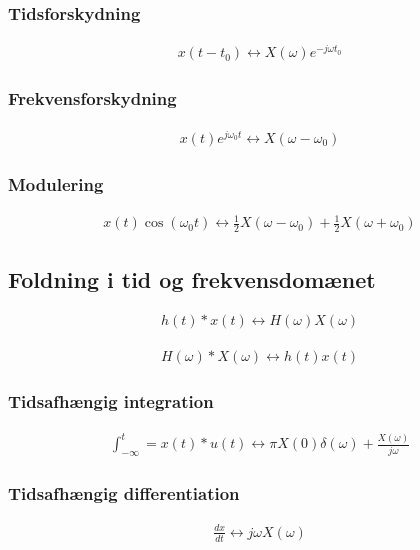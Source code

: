 	\subsubsection{Tidsforskydning}
		\begin{align}
			x(t-t_0)\leftrightarrow X(\omega)e^{-j\omega t_0}
		\end{align}

	\subsubsection{Frekvensforskydning}
		\begin{align}
			x(t)e^{j\omega_0t}\leftrightarrow X(\omega-\omega_0)
		\end{align}

	\subsubsection{Modulering}
		\begin{align}
			x(t)\cos(\omega_0t)\leftrightarrow\frac{1}{2}X(\omega-\omega_0)+\frac{1}{2}X(\omega+\omega_0)
		\end{align}

\subsection{Foldning i tid og frekvensdomænet}
	\begin{align}
		h(t)*x(t)\leftrightarrow H(\omega)X(\omega)
	\end{align}

	\begin{align}
		H(\omega)*X(\omega)\leftrightarrow h(t)x(t)
	\end{align}

	\subsubsection{Tidsafhængig integration}
		\begin{align}
			\int_{-\infty}^{t}=x(t)*u(t)\leftrightarrow\pi X(0)\delta(\omega)+\frac{X(\omega)}{j\omega}
		\end{align}
	
	\subsubsection{Tidsafhængig differentiation}
		\begin{align}
			\frac{dx}{dt}\leftrightarrow j\omega X(\omega)
		\end{align}
